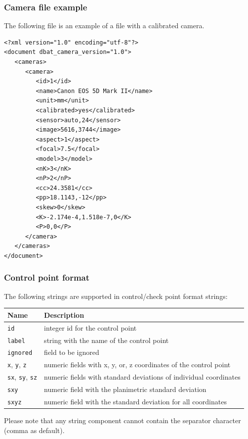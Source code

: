 \documentclass{article}
\begin{document}
\subsubsection{Camera file example}
\label{sec:camFileExample}
The following file is an example of a file with a calibrated camera.
\begin{verbatim}
<?xml version="1.0" encoding="utf-8"?>
<document dbat_camera_version="1.0">
   <cameras>
      <camera>
         <id>1</id>
         <name>Canon EOS 5D Mark II</name>
         <unit>mm</unit>
         <calibrated>yes</calibrated>
         <sensor>auto,24</sensor>
         <image>5616,3744</image>
         <aspect>1</aspect>
         <focal>7.5</focal>
         <model>3</model>
         <nK>3</nK>
         <nP>2</nP>
         <cc>24.3581</cc>
         <pp>18.1143,-12</pp>
         <skew>0</skew>
         <K>-2.174e-4,1.518e-7,0</K>
         <P>0,0</P>
      </camera>
   </cameras>
</document>
\end{verbatim}
\subsubsection{Control point format}
\label{sec:ctrlFormat}
The following strings are supported in control/check point format
strings:
\begin{center}
\begin{tabular}{l|l}
Name & Description\\
\hline
\texttt{id} & integer id for the control point\\
\texttt{label} & string with the name of the control point\\
\texttt{ignored} & field to be ignored\\
\texttt{x}, \texttt{y}, \texttt{z} & numeric fields with x, y, or, z coordinates of the control point\\
\texttt{sx}, \texttt{sy}, \texttt{sz} & numeric fields with standard deviations of individual coordinates\\
\texttt{sxy} & numeric field with the planimetric standard deviation\\
\texttt{sxyz} & numeric field with the standard deviation for all coordinates\\
\end{tabular}
\end{center}
Please note that any string component cannot contain the separator
character (comma as default).
\end{document}

